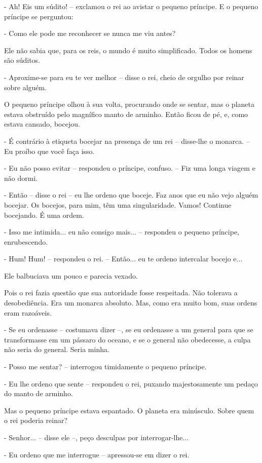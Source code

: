 - Ah! Eis um súdito! -- exclamou o rei ao avistar o pequeno príncipe. E
o pequeno príncipe se perguntou:

- Como ele pode me reconhecer se nunca me viu antes?

Ele não sabia que, para os reis, o mundo é muito simplificado. Todos os
homens são súditos.

- Aproxime-se para eu te ver melhor -- disse o rei, cheio de orgulho por
reinar sobre alguém.

O pequeno príncipe olhou à sua volta, procurando onde se sentar, mas o
planeta estava obstruído pelo magnífico manto de arminho. Então ficou de
pé, e, como estava cansado, bocejou.

- É contrário à etiqueta bocejar na presença de um rei -- disse-lhe o
monarca. -- Eu proíbo que você faça isso.

- Eu não posso evitar -- respondeu o príncipe, confuso. -- Fiz uma longa
viagem e não dormi.

- Então -- disse o rei -- eu lhe ordeno que boceje. Faz anos que eu não
vejo alguém bocejar. Os bocejos, para mim, têm uma singularidade. Vamos!
Continue bocejando. É uma ordem.

- Isso me intimida... eu não consigo mais... -- respondeu o pequeno
príncipe, enrubescendo.

- Hum! Hum! -- respondeu o rei. -- Então... eu te ordeno intercalar
bocejo e...

Ele balbuciava um pouco e parecia vexado.

Pois o rei fazia questão que sua autoridade fosse respeitada. Não
tolerava a desobediência. Era um monarca absoluto. Mas, como era muito
bom, suas ordens eram razoáveis.

- Se eu ordenasse -- costumava dizer --, se eu ordenasse a um general
para que se transformasse em um pássaro do oceano, e se o general não
obedecesse, a culpa não seria do general. Seria minha.

- Posso me sentar? -- interrogou timidamente o pequeno príncipe.

- Eu lhe ordeno que sente -- respondeu o rei, puxando majestosamente um
pedaço do manto de arminho.

Mas o pequeno príncipe estava espantado. O planeta era minúsculo. Sobre
quem o rei poderia reinar?

- Senhor... -- disse ele --, peço desculpas por interrogar-lhe...

- Eu ordeno que me interrogue -- apressou-se em dizer o rei.

